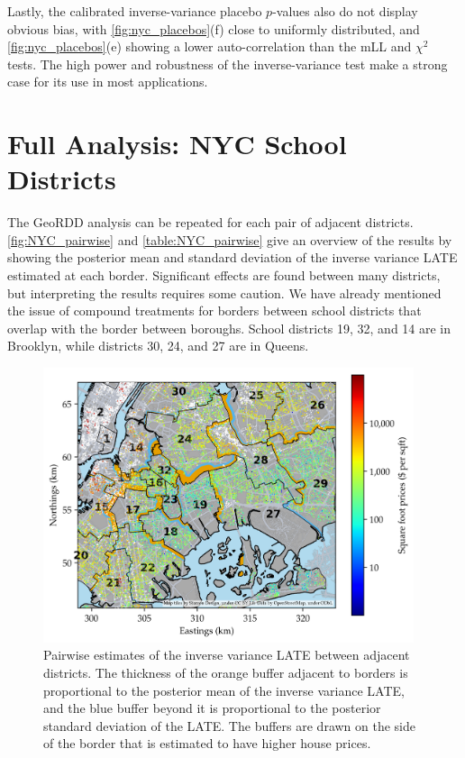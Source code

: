     Lastly, the calibrated inverse-variance placebo \(p\)-values also do not display obvious bias, with \autoref{fig:nyc_placebos}(f) close to uniformly distributed, and \autoref{fig:nyc_placebos}(e) showing a lower auto-correlation than the mLL and \(\chi^2\) tests.
The high power and robustness of the inverse-variance test make a strong case for its use in most applications.


\section{Full Analysis: NYC School Districts}
\label{pairs-of-school-districts}




    The GeoRDD analysis can be repeated for each pair of adjacent districts.
\autoref{fig:NYC_pairwise} and \autoref{table:NYC_pairwise} give an overview of the results by showing the posterior mean and standard deviation of the inverse variance LATE estimated at each border.
Significant effects are found between many districts, but interpreting the results requires some caution.
We have already mentioned the issue of compound treatments for borders between school districts that overlap with the border between boroughs.
School districts 19, 32, and 14 are in Brooklyn, while districts 30, 24, and 27 are in Queens.


\begin{figure}[!tb]
    \centering
    \includegraphics[width=0.97\textwidth,height=0.8\textheight,keepaspectratio]{figures/pairwise_mean_se.png}
    \caption{
        \label{fig:NYC_pairwise}
        Pairwise estimates of the inverse variance LATE between adjacent districts.
        The thickness of the orange buffer adjacent to borders is proportional to the posterior mean of the inverse variance LATE, and the blue buffer beyond it is proportional to the posterior standard deviation of the LATE.
    The buffers are drawn on the side of the border that is estimated to have higher house prices.}
\end{figure}

